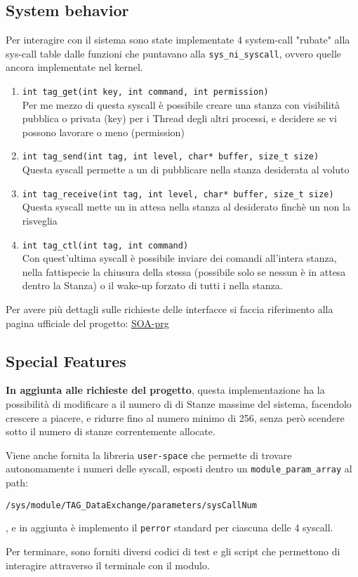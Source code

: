 \subsection{System behavior}

Per interagire con il sistema sono state implementate 4 system-call "rubate" alla sys-call table dalle funzioni che
puntavano alla \verb|sys_ni_syscall|, ovvero quelle ancora implementate nel kernel.

\begin{enumerate}
    \item \verb|int tag_get(int key, int command, int permission)|\\
    Per me mezzo di questa syscall è possibile creare una stanza con visibilità pubblica o privata (key) per i
    Thread degli altri processi, e decidere se vi possono lavorare o meno (permission)
    \item \verb|int tag_send(int tag, int level, char* buffer, size_t size)|\\
    Questa syscall permette a un \Writer di pubblicare nella stanza desiderata al \Topic voluto
    \item \verb|int tag_receive(int tag, int level, char* buffer, size_t size)|\\
    Questa syscall mette un \Reader in attesa nella stanza al \Topic desiderato finchè un \Writer non la risveglia
    \item \verb|int tag_ctl(int tag, int command)|\\
    Con quest'ultima syscall è possibile inviare dei comandi all'intera stanza, nella fattispecie la chiusura della
    stessa (possibile solo se nessun \Reader è in attesa dentro la Stanza) o il wake-up forzato di tutti i \Reader
    nella stanza.
\end{enumerate}
Per avere più dettagli sulle richieste delle interfacce si faccia riferimento alla pagina ufficiale del progetto:
\href{https://francescoquaglia.github.io/TEACHING/AOS/PROJECTS/project-specification-2020-2021.html}{SOA-prg}

\subsection{Special Features} \label{specialFeature}
\textbf{In aggiunta alle richieste del progetto}, questa implementazione ha la possibilità di modificare a
\RunTime il numero di di Stanze massime del sistema, facendolo crescere a piacere, e ridurre fino al numero minimo di
256, senza però scendere sotto il numero di stanze correntemente allocate.


Viene anche fornita la libreria \texttt{user-space} che permette di trovare autonomamente i numeri delle syscall,
esposti dentro un \verb|module_param_array| al path:
\begin{footnotesize}\verb|/sys/module/TAG_DataExchange/parameters/sysCallNum|\end{footnotesize}, e in aggiunta è
implemento il
\texttt{perror} standard per ciascuna delle 4 syscall.

Per terminare, sono forniti diversi codici di test e gli script che permettono di interagire attraverso il terminale
con il modulo.
